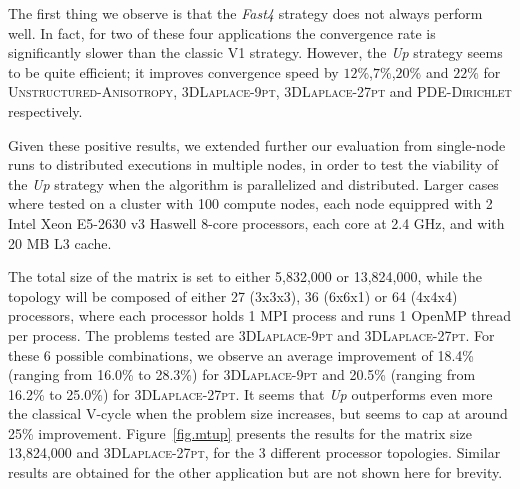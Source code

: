 The first thing we observe is that the \emph{Fast4} strategy does not
always perform well. In fact, for two of these four applications the
convergence rate is significantly slower than the classic V1 strategy.
However, the \emph{Up} strategy seems to be quite efficient; it improves
convergence speed by $12\%$,$7\%$,$20\%$ and $22\%$ for
\textsc{Unstructured-Anisotropy}, \textsc{3DLaplace-9pt},
\textsc{3DLaplace-27pt} and \textsc{PDE-Dirichlet} respectively.

Given these positive results, we extended further our evaluation from
single-node runs to distributed executions in multiple nodes, in order to test
the viability of the \emph{Up} strategy when the algorithm is parallelized and
distributed. Larger cases where tested on a cluster with 100 compute nodes, 
each node equippred with 2 Intel Xeon E5-2630 v3 Haswell 8-core processors, 
each core at 2.4 GHz, and with 20 MB L3 cache.

The total size of the matrix is set to either 5,832,000 or 13,824,000, while
the topology will be composed of either 27 (3x3x3), 36 (6x6x1) or 64 (4x4x4)
processors, where each processor holds 1 MPI process and runs 1 OpenMP
thread per process. The problems tested are \textsc{3DLaplace-9pt} and
\textsc{3DLaplace-27pt}.  For these 6 possible combinations, we observe an
average improvement of 18.4\% (ranging from 16.0\% to 28.3\%) for
\textsc{3DLaplace-9pt} and 20.5\% (ranging from 16.2\% to 25.0\%) for
\textsc{3DLaplace-27pt}. It seems that \emph{Up} outperforms even more the
classical V-cycle when the problem size increases, but seems to cap at around
25\% improvement. Figure~\ref{fig.mtup} presents the results for the matrix
size 13,824,000 and \textsc{3DLaplace-27pt}, for the 3 different processor
topologies. Similar results are obtained for the other application but are not
shown here for brevity.


